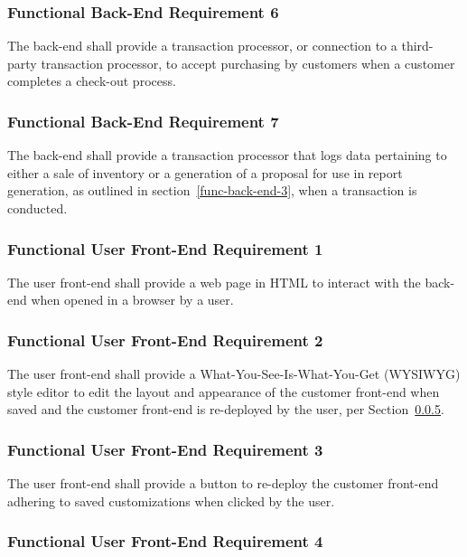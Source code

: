 \documentclass{article}
\begin{document}
\subsubsection{Functional Back-End Requirement 6}
\label{func-back-end-6}

The back-end shall provide a transaction processor, or connection to a 
third-party transaction processor, to accept purchasing by customers
when a customer completes a check-out process.

\subsubsection{Functional Back-End Requirement 7}
\label{func-back-end-7}

The back-end shall provide a transaction processor that logs data pertaining
to either a sale of inventory or a generation of a proposal for use in report
generation, as outlined in section~\ref{func-back-end-3}, when a transaction
is conducted.

\subsubsection{Functional User Front-End Requirement 1}
\label{func-user-front-end-1}

The user front-end shall provide a web page in HTML to interact with the
back-end when opened in a browser by a user.

\subsubsection{Functional User Front-End Requirement 2}
\label{func-user-front-end-2}

The user front-end shall provide a What-You-See-Is-What-You-Get (WYSIWYG) style
editor to edit the layout and appearance of the customer front-end when saved
and the customer front-end is re-deployed by the user, per 
Section~\ref{func-user-front-end-3}.

\subsubsection{Functional User Front-End Requirement 3}
\label{func-user-front-end-3}

The user front-end shall provide a button to re-deploy the customer front-end
adhering to saved customizations when clicked by the user.

\subsubsection{Functional User Front-End Requirement 4}
\label{func-user-front-end-4}
\end{document}
